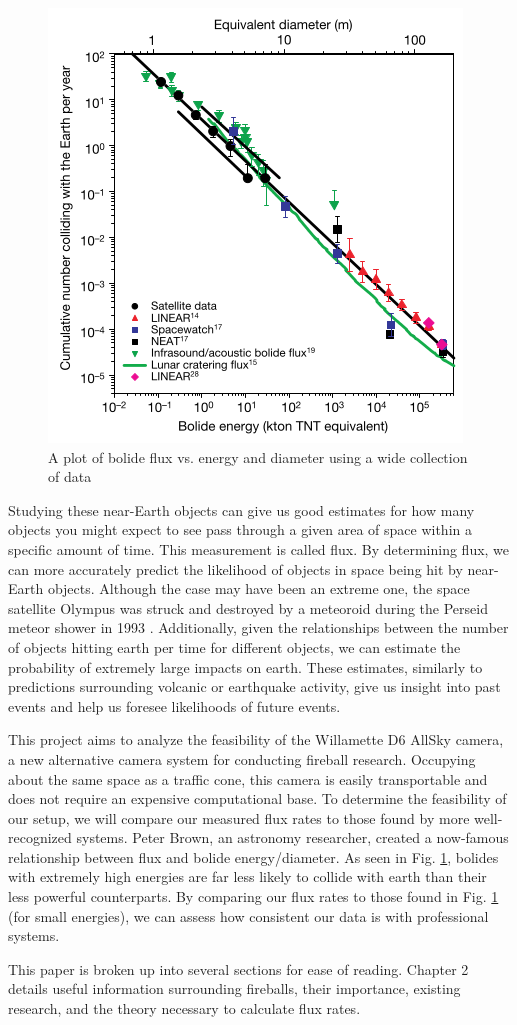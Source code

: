 \begin{figure}[ht!]
  \centering
  \includegraphics[scale=0.9]{images/flux_brown.png}
  \caption{A plot of bolide flux vs. energy and diameter using a wide collection of data}
  \label{brown}
\end{figure}

Studying these near-Earth objects can give us good estimates for how many objects you might expect to see pass through a given area of space within a specific amount of time.
This measurement is called flux.
By determining flux, we can more accurately predict the likelihood of objects in space being hit by near-Earth objects. 
Although the case may have been an extreme one, the space satellite Olympus was struck and destroyed by a meteoroid during the Perseid meteor shower in 1993 \cite{bobrowsky_comet/asteroid_nodate}.
Additionally, given the relationships between the number of objects hitting earth per time for different objects, we can estimate the probability of extremely large impacts on earth.
These estimates, similarly to predictions surrounding volcanic or earthquake activity, give us insight into past events and help us foresee likelihoods of future events.

This project aims to analyze the feasibility of the Willamette D6 AllSky camera, a new alternative camera system for conducting fireball research. 
Occupying about the same space as a traffic cone, this camera is easily transportable and does not require an expensive computational base.
To determine the feasibility of our setup, we will compare our measured flux rates to those found by more well-recognized systems.
Peter Brown, an astronomy researcher, created a now-famous relationship between flux and bolide energy/diameter. 
As seen in Fig. \ref{brown}, bolides with extremely high energies are far less likely to collide with earth than their less powerful counterparts.
By comparing our flux rates to those found in Fig. \ref{brown} (for small energies), we can assess how consistent our data is with professional systems.

This paper is broken up into several sections for ease of reading. Chapter 2 details useful information surrounding fireballs, their importance, existing research, and the theory necessary to calculate flux rates.
